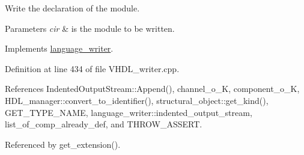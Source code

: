 Write the declaration of the module. 


\begin{DoxyParams}{Parameters}
{\em cir} & is the module to be written. \\
\hline
\end{DoxyParams}


Implements \hyperlink{classlanguage__writer_a32b5b9395eb518430fca70b1d49ff133}{language\+\_\+writer}.



Definition at line 434 of file V\+H\+D\+L\+\_\+writer.\+cpp.



References Indented\+Output\+Stream\+::\+Append(), channel\+\_\+o\+\_\+K, component\+\_\+o\+\_\+K, H\+D\+L\+\_\+manager\+::convert\+\_\+to\+\_\+identifier(), structural\+\_\+object\+::get\+\_\+kind(), G\+E\+T\+\_\+\+T\+Y\+P\+E\+\_\+\+N\+A\+ME, language\+\_\+writer\+::indented\+\_\+output\+\_\+stream, list\+\_\+of\+\_\+comp\+\_\+already\+\_\+def, and T\+H\+R\+O\+W\+\_\+\+A\+S\+S\+E\+RT.



Referenced by get\+\_\+extension().


